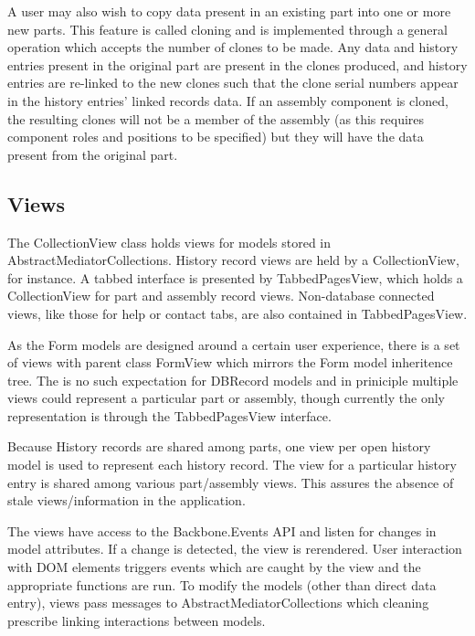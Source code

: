 \documentclass[journal]{IEEEtran}
\begin{document}
A user may also wish to copy data present in an existing part into one or more new parts. This
feature is called cloning and is implemented through a general operation which accepts the number
of clones to be made. Any data and history entries present in the original part are present in the
clones produced, and history entries are re-linked to the new clones such that the clone serial
numbers appear in the history entries' linked records data. If an assembly component is cloned, the
resulting clones will not be a member of the assembly (as this requires component roles and positions
to be specified) but they will have the data present from the original part.

\subsection{Views}

The CollectionView class holds views for models stored in AbstractMediatorCollections. History record 
views are held by a CollectionView, for instance. A tabbed interface is presented by TabbedPagesView,
which holds a CollectionView for part and assembly record views. Non-database connected views, like those
for help or contact tabs, are also contained in TabbedPagesView.

As the Form models are designed around a certain user experience, there is a set of views with parent class
FormView which mirrors the Form model inheritence tree. The is no such expectation for DBRecord models and
in priniciple multiple views could represent a particular part or assembly, though currently the only representation is
through the TabbedPagesView interface.

Because History records are shared among parts, one view per open history model is used to represent each history
record. The view for a particular history entry is shared among various part/assembly views. This assures the absence of
stale views/information in the application.

The views have access to the Backbone.Events API and listen for changes in model attributes. If a change is detected,
the view is rerendered. User interaction with DOM elements triggers events which are caught by the view and the appropriate
functions are run. To modify the models (other than direct data entry), views pass messages to AbstractMediatorCollections
which cleaning prescribe linking interactions between models.
\end{document}

